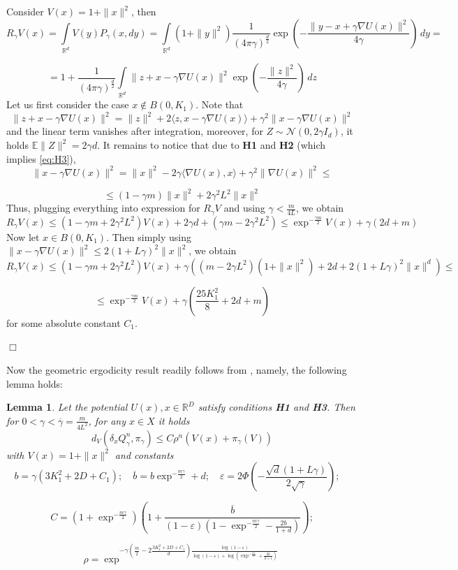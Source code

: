 \documentclass[bj]{imsart}
\newcommand{\proofendsign}{$\Box$}
\newtheorem{lem}[thm]{Lemma}
\newenvironment{proof}{{\noindent \bf Proof }}
 {{\hspace*{\fill}\proofendsign\par\bigskip}}
\begin{document}
\begin{proof} Consider $V(x) = 1 + \|x\|^2$, then
$$
R_{\gamma}V(x) = \int\limits_{\mathbb{R}^d}V(y)P_{\gamma}(x,dy) = \int\limits_{\mathbb{R}^d}(1+\|y\|^2)\frac{1}{(4\pi\gamma)^{\frac{d}{2}}}\exp{\left(-\frac{\|y-x+\gamma\nabla U(x)\|^2}{4\gamma}\right)}\,dy = 
$$

$$
=1 + \frac{1}{(4\pi\gamma)^{\frac{d}{2}}}\int\limits_{\mathbb{R}^d}\|z + x - \gamma \nabla U(x)\|^2 \exp{\left(-\frac{\|z\|^2}{4\gamma}\right)}\,dz
$$
Let us first consider the case $x \notin B(0,K_1)$. Note that 
$$
\|z+x-\gamma \nabla U(x)\|^2 = \|z\|^2 + 2 \langle z, x - \gamma \nabla U(x) \rangle + \gamma^2 \|x - \gamma \nabla U(x)\|^2
$$ 
and the linear term vanishes after integration, moreover, for $Z \sim \mathcal{N}(0,2\gamma I_d)$, it holds $\mathbb{E}\|Z\|^2 = 2\gamma d$. It remains to notice that due to {\bf H1} and {\bf H2} (which implies \ref{eq:H3}),
$$
\|x - \gamma \nabla U(x) \|^2 = \|x\|^2 - 2\gamma \langle \nabla U(x), x\rangle + \gamma^2 \|\nabla U(x)\|^2 \leq
$$

$$
 \leq (1-\gamma m)\|x\|^2 + 2\gamma^2 L^2 \|x\|^2
$$
Thus, plugging everything into expression for $R_{\gamma}V$ and using $\gamma < \frac{m}{4L}$, we obtain
$$
R_{\gamma}V(x) \leq (1-\gamma m + 2\gamma^2 L^2)V(x) + 2\gamma d + (\gamma m - 2\gamma^2 L^2) \leq \exp^{-\frac{\gamma m}{2}}V(x) + \gamma (2d + m)
$$
Now let $x \in B(0,K_1)$. Then simply using $\|x-\gamma \nabla U(x)\|^2 \leq 2(1+L\gamma)^2\|x\|^2$, we obtain
$$
R_{\gamma}V(x) \leq (1-\gamma m + 2\gamma^2 L^2)V(x) + \gamma\left((m - 2\gamma L^2)(1+\|x\|^2) + 2d + 2(1+L\gamma)^2\|x\|^d\right) \leq 
$$

$$
\leq \exp^{-\frac{\gamma m}{2}}V(x) + \gamma(\frac{25K_1^2}{8} + 2d + m)
$$
for some absolute constant $C_1$.
\end{proof}

Now the geometric ergodicity result readily follows from \cite[Theorem~19.4.1]{douc:moulines:priouret:soulier:2018}, namely, the following lemma holds:

\begin{lem} Let the potential $U(x), x \in \mathbb{R}^D$ satisfy conditions {\bf H1} and {\bf H3}. Then for $0 < \gamma < \overline{\gamma}=\frac{m}{4L^2}$, for any $x \in X$ it holds
$$
d_V(\delta_xQ^n_\gamma,\pi_\gamma) \leq C\rho^n\left(V(x) + \pi_\gamma(V)\right)
$$ 
with $V(x) = 1 + \|x\|^2$ and constants
$$
b = \gamma(3K_1^2 + 2D + C_1); \quad \overline{b} = b\exp^{-\frac{m\gamma}{2}} + d; \quad \varepsilon = 2\Phi\left(-\frac{\sqrt{d}(1+L\gamma)}{2\sqrt{\gamma}}\right); \quad
$$

$$
C = \left(1 + \exp^{-\frac{m\gamma}{2}}\right)\left(1+\frac{\overline{b}}{(1-\varepsilon)(1-\exp^{-\frac{m\gamma}{2}} - \frac{2b}{1+d})}\right);
$$

$$
\rho = \exp^{-\gamma\left(\frac{m}{2} - 2\frac{3K_1^2 + 2D + C_1}{d}\right)\frac{\log{(1-\varepsilon)}}{\log{(1-\varepsilon)} + \log{(\exp^{-\frac{m\gamma}{2}} + \frac{2b}{d+1})}}}
$$
\end{lem}
\end{document}
